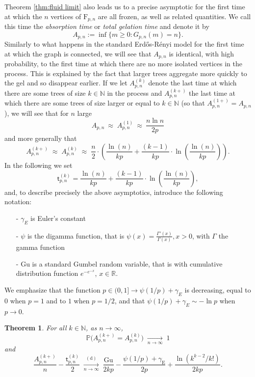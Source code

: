 \documentclass[a4, 11pt]{article}
\numberwithin{equation}{section}
\theoremstyle{plain}
\newtheorem{theorem}{Theorem}[section]
\theoremstyle{definition}
\theoremstyle{remark}
\begin{document}
Theorem \ref{thm:fluid limit} also leads us to a precise asymptotic for the first time at which the $n$ vertices of $\mathrm F_{p,n}$ are all frozen, as well as related quantities. We call this time the \emph{absorption time} or \emph{total gelation time} and denote it by 
$$A_{p,n}:=\inf\big\{m\geq 0 : G_{p,n}(m)=n\big\}.$$
Similarly to what happens in the standard Erd\H{o}s-R\'enyi model for the first time at which the graph is connected, we will see that $A_{p,n}$ is identical, with high probability, to the first time at which there are no more isolated vertices  in the process. This is explained by the fact that larger trees aggregate more quickly to the gel and so disappear earlier. If we let $A^{(k)}_{p,n}$ denote the last time at which there are some trees of size $k \in \mathbb N$ in the process and $A_{p,n}^{(k+)}$ the last time at which there are some trees of size larger or equal to $k \in \mathbb N$ (so that $A_{p,n}^{(1+)}=A_{p,n}$), we will see that for $n$ large
$$
A_{p,n}   \  \approx    \; A^{(1)}_{p,n}  \  \approx   \  \frac{n\ln n}{2p}
$$
and more generally that
$$
A_{p,n}^{(k+)} \; \approx \; A^{(k)}_{p,n}   \; \approx   \; \frac{n}{2} \cdot \left( \frac{\ln(n)}{kp}+\frac{(k-1)}{kp}\cdot \ln\left(\frac{\ln(n)}{kp}\right) \right).
$$
In the following we set
\begin{equation}
\label{def:tnk}
\mathsf t^{(k)}_{p,n}=\frac{\ln(n)}{kp}+\frac{(k-1)}{kp}\cdot \ln\left(\frac{\ln(n)}{kp}\right),
\end{equation}
and, to describe precisely the above asymptotics, introduce the following notation:
\begin{enumerate}[topsep=0cm]
\item[-] $\gamma_E$ is Euler's constant
\item[-] $\psi$ is the digamma function, that is $\psi(x)=\frac{\Gamma'(x)}{\Gamma(x)}, x>0$, with $\Gamma$ the gamma function
\item[-] $\mathrm{Gu}$ is a standard Gumbel random variable, that is with cumulative distribution function 
$e^{-e^{-x}}$, $x \in \mathbb R$.
\end{enumerate}
We emphasize that the function $p \in (0,1] \rightarrow \psi(1/p) +\gamma_E$ is decreasing, equal to 0 when $p=1$ and to $1$ when $p=1/2$, and that $\psi(1/p) +\gamma_E \sim -\ln p$ when $p \rightarrow 0$.

\begin{theorem}
\label{thm:absorption} 
For all $k \in \mathbb N$, 
as $n \rightarrow \infty$, 
$$
\mathbb P\Big(A^{(k+)}_{p,n} =A^{(k)}_{p,n}  \Big)  \; \underset{n \rightarrow \infty}{\longrightarrow} \; 1
$$
and
$$
\frac{A^{(k+)}_{p,n} }{n} - \frac{\mathsf t^{(k)}_{p,n}}{2}  \; \underset{n \rightarrow \infty}{\overset{(\mathrm d)}\longrightarrow} \; \frac{\mathrm{Gu}}{2kp}-\frac{\psi(1/p)+\gamma_{\mathrm E}}{2p}+\frac{\ln (k^{k-2}/k!)}{2kp}.
$$
\end{theorem}
\end{document}

